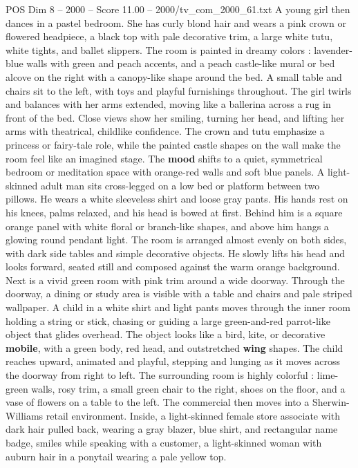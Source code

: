 \begin{textsample}{POS Dim 8 – 2000 – Score 11.00 – 2000/tv\_com\_2000\_61.txt}
A young girl then dances in a pastel bedroom.
She has curly blond hair and wears a pink crown or flowered headpiece, a black top with pale decorative trim, a large white tutu, white tights, and ballet slippers.
The room is painted in dreamy colors : lavender-blue walls with green and peach accents, and a peach castle-like mural or bed alcove on the right with a canopy-like shape around the bed.
A small table and chairs sit to the left, with toys and playful furnishings throughout.
The girl twirls and balances with her arms extended, moving like a ballerina across a rug in front of the bed.
Close views show her smiling, turning her head, and lifting her arms with theatrical, childlike confidence.
The crown and tutu emphasize a princess or fairy-tale role, while the painted castle shapes on the wall make the room feel like an imagined stage.
The \textbf{mood} shifts to a quiet, symmetrical bedroom or meditation space with orange-red walls and soft blue panels.
A light-skinned adult man sits cross-legged on a low bed or platform between two pillows.
He wears a white sleeveless shirt and loose gray pants.
His hands rest on his knees, palms relaxed, and his head is bowed at first.
Behind him is a square orange panel with white floral or branch-like shapes, and above him hangs a glowing round pendant light.
The room is arranged almost evenly on both sides, with dark side tables and simple decorative objects.
He slowly lifts his head and looks forward, seated still and composed against the warm orange background.
Next is a vivid green room with pink trim around a wide doorway.
Through the doorway, a dining or study area is visible with a table and chairs and pale striped wallpaper.
A child in a white shirt and light pants moves through the inner room holding a string or stick, chasing or guiding a large green-and-red parrot-like object that glides overhead.
The object looks like a bird, kite, or decorative \textbf{mobile}, with a green body, red head, and outstretched \textbf{wing} shapes.
The child reaches upward, animated and playful, stepping and lunging as it moves across the doorway from right to left.
The surrounding room is highly colorful : lime-green walls, rosy trim, a small green chair to the right, shoes on the floor, and a vase of flowers on a table to the left.
The commercial then moves into a Sherwin-Williams retail environment.
Inside, a light-skinned female store associate with dark hair pulled back, wearing a gray blazer, blue shirt, and rectangular name badge, smiles while speaking with a customer, a light-skinned woman with auburn hair in a ponytail wearing a pale yellow top.

\end{textsample}
